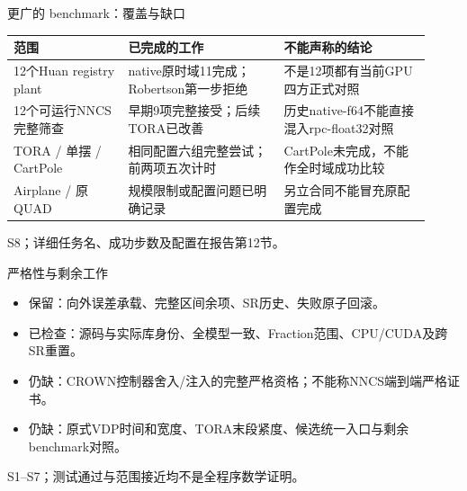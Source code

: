 \documentclass[UTF8,fontset=fandol,aspectratio=169,10pt]{ctexbeamer}
\begin{document}
\begin{frame}{更广的 benchmark：覆盖与缺口}
{\fontsize{8.5}{11}\selectfont
{\setlength{\tabcolsep}{2pt}\renewcommand{\arraystretch}{1.25}
\begin{tabular}{>{\raggedright\arraybackslash}p{0.258\linewidth}>{\raggedright\arraybackslash}p{0.340\linewidth}>{\raggedright\arraybackslash}p{0.322\linewidth}}
\toprule
\textbf{范围} & \textbf{已完成的工作} & \textbf{不能声称的结论} \\
\midrule
12个Huan registry plant & native原时域11完成；Robertson第一步拒绝 & 不是12项都有当前GPU四方正式对照 \\
12个可运行NNCS完整筛查 & 早期9项完整接受；后续TORA已改善 & 历史native-f64不能直接混入rpc-float32对照 \\
TORA /\allowbreak{} 单摆 /\allowbreak{} CartPole & 相同配置六组完整尝试；前两项五次计时 & CartPole未完成，不能作全时域成功比较 \\
Airplane /\allowbreak{} 原QUAD & 规模限制或配置问题已明确记录 & 另立合同不能冒充原配置完成 \\
\bottomrule
\end{tabular}
}
}\par
\par\vfill{\fontsize{6.5}{8}\selectfont\color{gray}S8；详细任务名、成功步数及配置在报告第12节。} 
\end{frame}
\begin{frame}{严格性与剩余工作}
\begin{itemize}
\item 保留：向外误差承载、完整区间余项、SR历史、失败原子回滚。
\item 已检查：源码与实际库身份、全模型一致、Fraction范围、CPU/\allowbreak{}CUDA及跨SR重置。
\item 仍缺：CROWN控制器舍入/\allowbreak{}注入的完整严格资格；不能称NNCS端到端严格证书。
\item 仍缺：原式VDP时间和宽度、TORA末段紧度、候选统一入口与剩余benchmark对照。
\end{itemize}\par\vfill{\fontsize{6.5}{8}\selectfont\color{gray}S1–S7；测试通过与范围接近均不是全程序数学证明。} 
\end{frame}
\end{document}
